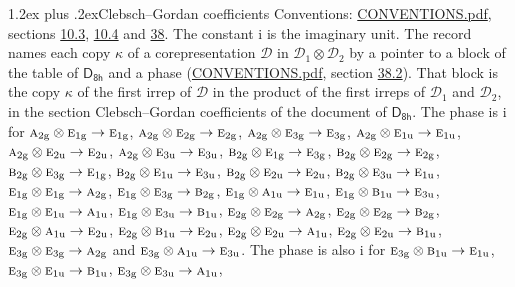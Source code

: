 \documentclass[10pt,a4paper]{article}
\makeatletter
\renewcommand\section{\@startsection{section}{1}{\z@}{-3ex plus -1ex minus -.2ex}%
  {1.2ex plus .2ex}{\normalfont\large\sffamily\bfseries\color{parttitle}}}
\numberwithin{equation}{section}
\newcommand{\grp}[1]{\mathsf{#1}}
\newcommand{\irr}[1]{\text{\normalfont\scshape #1}}
\newcommand{\ptag}[1]{\mathrm{#1}}
\newcommand{\iunit}{\mathrm{i}}
\newcommand{\irrprod}{\otimes}
\newcommand{\mult}{\kappa}
\makeatother
\begin{document}
\section{Clebsch--Gordan coefficients}\label{s:clebsch_gordan}
Conventions: \href{../../CONVENTIONS.pdf}{CONVENTIONS.pdf}, sections \href{../../../rotation/CONVENTIONS.pdf\#conv.10.3}{10.3}, \href{../../../rotation/CONVENTIONS.pdf\#conv.10.4}{10.4} and \href{../../CONVENTIONS.pdf\#conv.38}{38}.
The constant $\iunit$ is the imaginary unit.
\leavevmode\label{n:index.copy}The record names each copy $\mult$ of a corepresentation $\mathcal{D}$ in $\mathcal{D}_1\irrprod\mathcal{D}_2$ by a pointer to a block of the table of $\grp{D_{8h}}$ and a phase (\href{../../CONVENTIONS.pdf}{CONVENTIONS.pdf}, section \href{../../CONVENTIONS.pdf\#conv.38.2}{38.2}). That block is the copy $\mult$ of the first irrep of $\mathcal{D}$ in the product of the first irreps of $\mathcal{D}_1$ and $\mathcal{D}_2$, in the section Clebsch--Gordan coefficients of the document of \href{../../../rotation/data/pdf/D8h.pdf}{$\grp{D_{8h}}$}. The phase is $\iunit$ for $\irr{a}_{2\ptag{g}}\irrprod \irr{e}_{1\ptag{g}}\to \irr{e}_{1\ptag{g}}$, $\irr{a}_{2\ptag{g}}\irrprod \irr{e}_{2\ptag{g}}\to \irr{e}_{2\ptag{g}}$, $\irr{a}_{2\ptag{g}}\irrprod \irr{e}_{3\ptag{g}}\to \irr{e}_{3\ptag{g}}$, $\irr{a}_{2\ptag{g}}\irrprod \irr{e}_{1\ptag{u}}\to \irr{e}_{1\ptag{u}}$, $\irr{a}_{2\ptag{g}}\irrprod \irr{e}_{2\ptag{u}}\to \irr{e}_{2\ptag{u}}$, $\irr{a}_{2\ptag{g}}\irrprod \irr{e}_{3\ptag{u}}\to \irr{e}_{3\ptag{u}}$, $\irr{b}_{2\ptag{g}}\irrprod \irr{e}_{1\ptag{g}}\to \irr{e}_{3\ptag{g}}$, $\irr{b}_{2\ptag{g}}\irrprod \irr{e}_{2\ptag{g}}\to \irr{e}_{2\ptag{g}}$, $\irr{b}_{2\ptag{g}}\irrprod \irr{e}_{3\ptag{g}}\to \irr{e}_{1\ptag{g}}$, $\irr{b}_{2\ptag{g}}\irrprod \irr{e}_{1\ptag{u}}\to \irr{e}_{3\ptag{u}}$, $\irr{b}_{2\ptag{g}}\irrprod \irr{e}_{2\ptag{u}}\to \irr{e}_{2\ptag{u}}$, $\irr{b}_{2\ptag{g}}\irrprod \irr{e}_{3\ptag{u}}\to \irr{e}_{1\ptag{u}}$, $\irr{e}_{1\ptag{g}}\irrprod \irr{e}_{1\ptag{g}}\to \irr{a}_{2\ptag{g}}$, $\irr{e}_{1\ptag{g}}\irrprod \irr{e}_{3\ptag{g}}\to \irr{b}_{2\ptag{g}}$, $\irr{e}_{1\ptag{g}}\irrprod \irr{a}_{1\ptag{u}}\to \irr{e}_{1\ptag{u}}$, $\irr{e}_{1\ptag{g}}\irrprod \irr{b}_{1\ptag{u}}\to \irr{e}_{3\ptag{u}}$, $\irr{e}_{1\ptag{g}}\irrprod \irr{e}_{1\ptag{u}}\to \irr{a}_{1\ptag{u}}$, $\irr{e}_{1\ptag{g}}\irrprod \irr{e}_{3\ptag{u}}\to \irr{b}_{1\ptag{u}}$, $\irr{e}_{2\ptag{g}}\irrprod \irr{e}_{2\ptag{g}}\to \irr{a}_{2\ptag{g}}$, $\irr{e}_{2\ptag{g}}\irrprod \irr{e}_{2\ptag{g}}\to \irr{b}_{2\ptag{g}}$, $\irr{e}_{2\ptag{g}}\irrprod \irr{a}_{1\ptag{u}}\to \irr{e}_{2\ptag{u}}$, $\irr{e}_{2\ptag{g}}\irrprod \irr{b}_{1\ptag{u}}\to \irr{e}_{2\ptag{u}}$, $\irr{e}_{2\ptag{g}}\irrprod \irr{e}_{2\ptag{u}}\to \irr{a}_{1\ptag{u}}$, $\irr{e}_{2\ptag{g}}\irrprod \irr{e}_{2\ptag{u}}\to \irr{b}_{1\ptag{u}}$, $\irr{e}_{3\ptag{g}}\irrprod \irr{e}_{3\ptag{g}}\to \irr{a}_{2\ptag{g}}$ and $\irr{e}_{3\ptag{g}}\irrprod \irr{a}_{1\ptag{u}}\to \irr{e}_{3\ptag{u}}$. The phase is also $\iunit$ for $\irr{e}_{3\ptag{g}}\irrprod \irr{b}_{1\ptag{u}}\to \irr{e}_{1\ptag{u}}$, $\irr{e}_{3\ptag{g}}\irrprod \irr{e}_{1\ptag{u}}\to \irr{b}_{1\ptag{u}}$, $\irr{e}_{3\ptag{g}}\irrprod \irr{e}_{3\ptag{u}}\to \irr{a}_{1\ptag{u}}$, 
\end{document}
